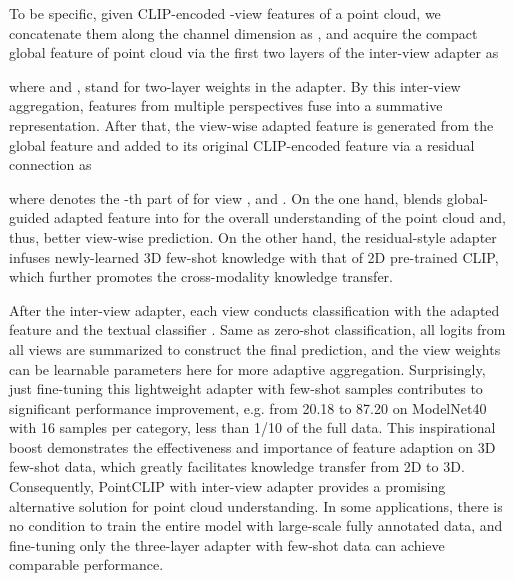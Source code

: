 \documentclass[10pt,twocolumn,letterpaper]{article}
\begin{document}
To be specific, given CLIP-encoded -view features of a point cloud, we concatenate them along the channel dimension as  , and acquire the compact global feature of point cloud via the first two layers of the inter-view adapter as

where  and ,  stand for two-layer weights in the adapter. By this inter-view aggregation, features from multiple perspectives fuse into a summative representation. After that, the view-wise adapted feature is generated from the global feature and added to its original CLIP-encoded feature via a residual connection as

where  denotes the -th part of  for view , and . On the one hand,  blends global-guided adapted feature into  for the overall understanding of the point cloud and, thus, better view-wise prediction. On the other hand, the residual-style adapter infuses newly-learned 3D few-shot knowledge with that of 2D pre-trained CLIP, which further promotes the cross-modality knowledge transfer.

After the inter-view adapter, each view conducts classification with the adapted feature  and the textual classifier . Same as zero-shot classification, all  logits from all views are summarized to construct the final prediction, and the view weights  can be learnable parameters here for more adaptive aggregation. Surprisingly, just fine-tuning this lightweight adapter with few-shot samples contributes to significant performance improvement, e.g. from 20.18 to 87.20 on ModelNet40 with 16 samples per category, less than 1/10 of the full data. This inspirational boost demonstrates the effectiveness and importance of feature adaption on 3D few-shot data, which greatly facilitates knowledge transfer from 2D to 3D. Consequently, PointCLIP with inter-view adapter provides a promising alternative solution for point cloud understanding. In some applications, there is no condition to train the entire model with large-scale fully annotated data, and fine-tuning only the three-layer adapter with few-shot data can achieve comparable performance.





\vspace*{1pt}
\end{document}
